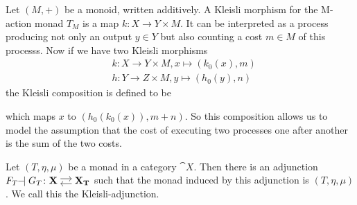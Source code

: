 \begin{example}
    Let $(M,+)$ be a monoid, written additively. A Kleisli morphism for the M-action monad $T_M$
    is a map $k \colon X \to Y \times M$. It can be interpreted as a process producing not only 
    an output $y \in Y$ but also counting a cost $m \in M$ of this processs.
    Now if we have two Kleisli morphisms 
    \begin{align*}
        &k \colon X \to Y \times M, x \mapsto (k_0(x),m) \\
        &h \colon Y \to Z \times M, y \mapsto (h_0(y),n)
    \end{align*}
    the Kleisli composition is defined to be
    which maps $x$ to $(h_0(k_0(x)),m+n)$. So this composition allows us to model the assumption
    that the cost of executing two processes one after another is the sum of the two costs.
\end{example}
\begin{theorem}
    Let $(T,\eta,\mu)$ be a monad in a category $\cat{X}$.
    Then there is an adjunction $F_T \! \! \adj G_T \colon \adjar{X}{X_T}$
    such that the monad induced by this adjunction is $(T,\eta,\mu)$.
    We call this the Kleisli-adjunction.
\end{theorem}
